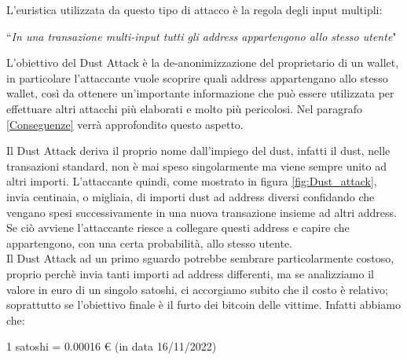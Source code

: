 L'euristica utilizzata da questo tipo di attacco è la regola degli input multipli:
\begin{center}
    ``\textit{In una transazione multi-input tutti gli address appartengono allo stesso utente}"
\end{center}
L'obiettivo del Dust Attack è la de-anonimizzazione del proprietario di un wallet, in particolare l'attaccante vuole scoprire quali address appartengano allo stesso wallet, così da ottenere un'importante informazione che può essere utilizzata per effettuare altri attacchi più elaborati e molto più pericolosi. Nel paragrafo \ref{Conseguenze} verrà approfondito questo aspetto.

Il Dust Attack deriva il proprio nome dall'impiego del dust, infatti il dust, nelle transazioni standard, non è mai speso singolarmente ma viene sempre unito ad altri importi. L'attaccante quindi, come mostrato in figura \ref{fig:Dust_attack}, invia centinaia, o migliaia, di importi dust ad address diversi confidando che vengano spesi successivamente in una nuova transazione insieme ad altri address. Se ciò avviene l'attaccante riesce a collegare questi address e capire che appartengono, con una certa probabilità, allo stesso utente.\\ 

Il Dust Attack ad un primo sguardo potrebbe sembrare particolarmente costoso, proprio perchè invia tanti importi ad address differenti, ma se analizziamo il valore in euro di un singolo satoshi, ci accorgiamo subito che il costo è relativo; soprattutto se l'obiettivo finale è il furto dei bitcoin delle vittime. Infatti abbiamo che:
\begin{center}
    1 satoshi = 0.00016 € (in data 16/11/2022) 
\end{center}

